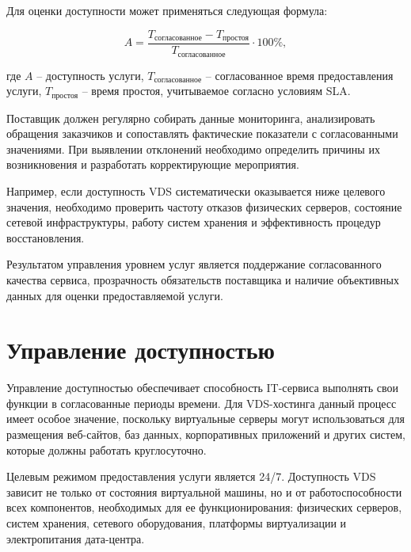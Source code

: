 \documentclass[14pt,a4paper]{extarticle}
\begin{document}
Для оценки доступности может применяться следующая формула:

\[
    A = \frac{T_{\text{согласованное}} -
    T_{\text{простоя}}}{T_{\text{согласованное}}} \cdot 100\%,
\]

где $A$ -- доступность услуги, $T_{\text{согласованное}}$ -- согласованное время
предоставления услуги, $T_{\text{простоя}}$ -- время простоя, учитываемое согласно
условиям SLA.

Поставщик должен регулярно собирать данные мониторинга, анализировать обращения
заказчиков и сопоставлять фактические показатели с согласованными значениями.
При выявлении отклонений необходимо определить причины их возникновения и
разработать корректирующие мероприятия.

Например, если доступность VDS систематически оказывается ниже целевого значения,
необходимо проверить частоту отказов физических серверов, состояние сетевой
инфраструктуры, работу систем хранения и эффективность процедур восстановления.

Результатом управления уровнем услуг является поддержание согласованного качества
сервиса, прозрачность обязательств поставщика и наличие объективных данных для
оценки предоставляемой услуги.

\section{Управление доступностью}

Управление доступностью обеспечивает способность IT-сервиса выполнять свои
функции в согласованные периоды времени. Для VDS-хостинга данный процесс имеет
особое значение, поскольку виртуальные серверы могут использоваться для
размещения веб-сайтов, баз данных, корпоративных приложений и других систем,
которые должны работать круглосуточно.

Целевым режимом предоставления услуги является 24/7. Доступность VDS зависит не
только от состояния виртуальной машины, но и от работоспособности всех компонентов,
необходимых для ее функционирования: физических серверов, систем хранения,
сетевого оборудования, платформы виртуализации и электропитания дата-центра.
\end{document}
